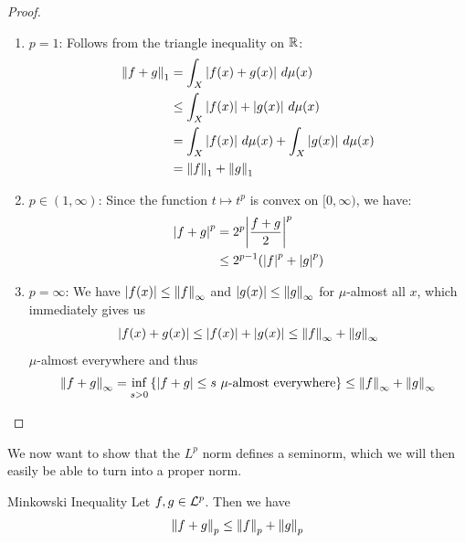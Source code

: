 \begin{proof}
	\begin{enumerate}
		\item $p = 1$: Follows from the triangle inequality on $\mathbb{R}$:
		\begin{align*}
			\norm{f + g}_1 
			&=
			\int_X \abs{f(x) + g(x)} ~d\mu(x)\\
			&\leq 
			\int_X \abs{f(x)} + \abs{g(x)} ~d\mu(x)\\
			&= \int_X \abs{f(x)} ~d\mu(x) + \int_X \abs{g(x)} ~d\mu(x)\\
			&= \norm{f}_1 + \norm{g}_1
		\end{align*}
		\item $p \in (1, \infty)$: Since the function $t \mapsto t^p$ is convex on $[0,\infty)$, we have:
		\begin{align*}
			\abs{f + g}^p 
			&=
			2^p \abs{\frac{f + g}{2}}^p\\
			&\leq
			2^{p-1}(\abs{f}^p + \abs{g}^p)
		\end{align*}
		\item $p = \infty$:
		We have $\abs{f(x)} \leq \norm{f}_\infty$ and $\abs{g(x)} \leq \norm{g}_\infty$ for $\mu$-almost all $x$, which immediately gives us
		\begin{align*}
			\abs{f(x) + g(x)} \leq \abs{f(x)} + \abs{g(x)} \leq \norm{f}_\infty + \norm{g}_\infty
		\end{align*}
		$\mu$-almost everywhere
		and thus
		\begin{align*}
			\norm{f + g}_\infty = \inf_{s > 0}\lr{\abs{f + g} \leq s \tn{ $\mu$-almost everywhere}} \leq \norm{f}_\infty + \norm{g}_\infty
		\end{align*}
	\end{enumerate}
\end{proof}
We now want to show that the $L^p$ norm defines a seminorm, which we will then easily be able to turn into a proper norm.
\begin{importanttheorem}{Minkowski Inequality}{}
	Let $f, g \in \mathcal{L}^p$. Then we have
	\begin{align*}
		\norm{f + g}_p \leq \norm{f}_p + \norm{g}_p
	\end{align*}
\end{importanttheorem}
